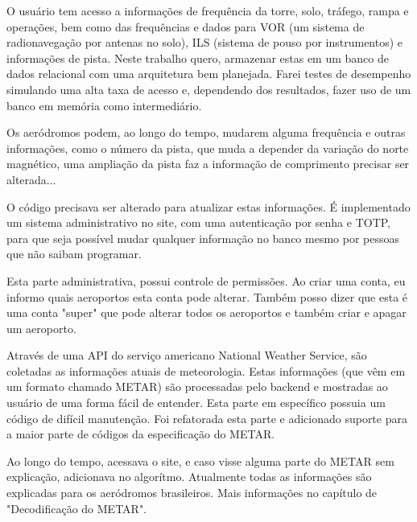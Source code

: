 O usuário tem acesso a informações de frequência da torre, solo, tráfego, rampa
e operações, bem como das frequências e dados para VOR (um sistema de radionavegação
por antenas no solo), ILS (sistema de pouso por instrumentos) e informações
de pista. Neste trabalho quero, armazenar estas
em um banco de dados relacional com uma arquitetura bem planejada. Farei testes
de desempenho simulando uma alta taxa de acesso e, dependendo dos resultados,
fazer uso de um banco em memória como intermediário. 

Os aeródromos podem, ao longo do tempo, mudarem alguma frequência e outras
informações, como o número da pista, que muda a depender da variação do norte magnético,
uma ampliação da pista faz a informação de comprimento precisar ser alterada...

O código precisava ser alterado para atualizar estas informações.
É implementado um sistema administrativo no site, com uma autenticação por
senha e TOTP, para que seja possível mudar qualquer informação no banco mesmo
por pessoas que não saibam programar.

Esta parte administrativa, possui controle de permissões. Ao criar uma
conta, eu informo quais aeroportos esta conta pode alterar. Também posso
dizer que esta é uma conta "super" que pode alterar todos os aeroportos
e também criar e apagar um aeroporto.

Através de uma API do serviço americano National Weather Service, são coletadas 
as informações atuais de meteorologia. Estas informações (que vêm em um formato
chamado METAR) são processadas pelo backend e mostradas ao usuário de uma forma 
fácil de entender. Esta parte em específico possuia um código de difícil manutenção.
Foi refatorada esta parte e adicionado suporte para a maior parte de códigos
da especificação do METAR.

Ao longo do tempo, acessava o site, e caso visse alguma parte do METAR sem explicação,
adicionava no algorítmo. Atualmente todas as informações são explicadas para
os aeródromos brasileiros. Mais informações no capítulo de "Decodificação do METAR".
